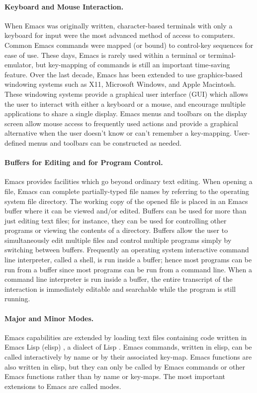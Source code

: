 \documentclass{article}
\begin{document}
\paragraph{Keyboard and Mouse Interaction.}
When Emacs was originally written, character-based terminals with only
a keyboard for input were the most advanced method of access to
computers.  Common Emacs commands were mapped (or bound) to control-key
sequences for ease of use.  These days, Emacs is
rarely used within a terminal or terminal-emulator, but key-mapping of
commands is still an important time-saving feature.  Over the last
decade, Emacs has been extended to use graphics-based windowing
systems such as X11, Microsoft Windows, and Apple Macintosh.  These
windowing systems provide a graphical user interface (GUI) which
allows the user to interact with either a keyboard or a mouse, and encourage
multiple applications to share a single display.  Emacs menus and
toolbars on the display screen allow mouse access to frequently used 
actions and provide a graphical alternative
when the user doesn't know or can't remember a key-mapping.  User-defined
menus and toolbars can be constructed as needed.

\paragraph{Buffers for Editing and for Program Control.}
Emacs provides facilities which go beyond ordinary text editing.  When
opening a file, Emacs can complete partially-typed file names by
referring to the operating system file directory.  The working copy of
the opened file is placed in an Emacs buffer where it can be viewed
and/or edited.  Buffers can be used for more than just editing text
files; for instance, they can be used for controlling other programs
or viewing the contents of a directory.  Buffers allow the user to simultaneously
edit multiple files and control multiple
programs simply by switching between buffers.  Frequently an operating
system interactive command line interpreter, called a shell,
is run inside a buffer; hence most programs can be run from a buffer
since most programs can be run from a command line.  When a command line 
interpreter is run inside a buffer, the entire
transcript of the interaction is immediately editable and searchable while the
program is still running.

\paragraph{Major and Minor Modes.}
Emacs capabilities are extended by loading text files containing code
written in Emacs Lisp (elisp) \citep{RChassell1999}, a dialect of Lisp
\citep{PGraham:1996}.  Emacs commands, written in elisp,
can be called interactively by name or by their associated key-map.
Emacs functions are also written in elisp, but they can only be called
by Emacs commands or other Emacs functions rather than by
name or key-maps.  The most important extensions to Emacs are called
modes.
\end{document}
